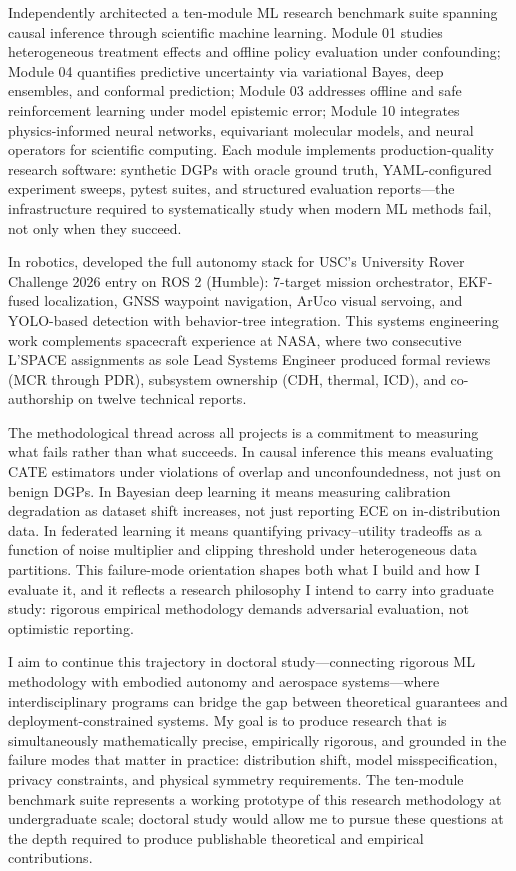 \documentclass[11pt,letterpaper]{article}
\begin{document}
Independently architected a ten-module ML research benchmark suite spanning causal inference through scientific machine learning. Module 01 studies heterogeneous treatment effects and offline policy evaluation under confounding; Module 04 quantifies predictive uncertainty via variational Bayes, deep ensembles, and conformal prediction; Module 03 addresses offline and safe reinforcement learning under model epistemic error; Module 10 integrates physics-informed neural networks, equivariant molecular models, and neural operators for scientific computing. Each module implements production-quality research software: synthetic DGPs with oracle ground truth, YAML-configured experiment sweeps, pytest suites, and structured evaluation reports---the infrastructure required to systematically study when modern ML methods fail, not only when they succeed.

In robotics, developed the full autonomy stack for USC's University Rover Challenge 2026 entry on ROS 2 (Humble): 7-target mission orchestrator, EKF-fused localization, GNSS waypoint navigation, ArUco visual servoing, and YOLO-based detection with behavior-tree integration. This systems engineering work complements spacecraft experience at NASA, where two consecutive L'SPACE assignments as sole Lead Systems Engineer produced formal reviews (MCR through PDR), subsystem ownership (CDH, thermal, ICD), and co-authorship on twelve technical reports.

The methodological thread across all projects is a commitment to measuring what fails rather than what succeeds. In causal inference this means evaluating CATE estimators under violations of overlap and unconfoundedness, not just on benign DGPs. In Bayesian deep learning it means measuring calibration degradation as dataset shift increases, not just reporting ECE on in-distribution data. In federated learning it means quantifying privacy--utility tradeoffs as a function of noise multiplier and clipping threshold under heterogeneous data partitions. This failure-mode orientation shapes both what I build and how I evaluate it, and it reflects a research philosophy I intend to carry into graduate study: rigorous empirical methodology demands adversarial evaluation, not optimistic reporting.

I aim to continue this trajectory in doctoral study---connecting rigorous ML methodology with embodied autonomy and aerospace systems---where interdisciplinary programs can bridge the gap between theoretical guarantees and deployment-constrained systems. My goal is to produce research that is simultaneously mathematically precise, empirically rigorous, and grounded in the failure modes that matter in practice: distribution shift, model misspecification, privacy constraints, and physical symmetry requirements. The ten-module benchmark suite represents a working prototype of this research methodology at undergraduate scale; doctoral study would allow me to pursue these questions at the depth required to produce publishable theoretical and empirical contributions.
\end{document}
